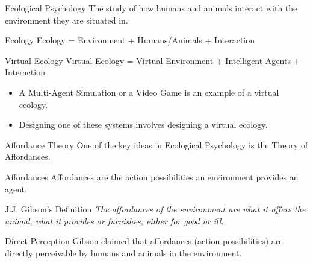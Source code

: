 \documentclass[xcolor=dvipsnames,t]{beamer}
\begin{document}
\begin{frame}{Ecological Psychology} 
    The study of how humans and animals interact with the environment they are
    situated in. 

    \begin{block}{Ecology} 
        Ecology = Environment + Humans/Animals + Interaction 
    \end{block} 
\pause
    \begin{block}{Virtual Ecology} 
        Virtual Ecology = Virtual Environment + Intelligent Agents + Interaction 
    \end{block} 
\pause
    \begin{itemize} 
        \item A Multi-Agent Simulation or a Video Game is an example of a virtual ecology. 
        \item Designing one of these systems involves designing a virtual ecology. 
    \end{itemize} 
\end{frame} 

\begin{frame}{Affordance Theory} 
    One of the key ideas in Ecological Psychology is the Theory of Affordances.

    \begin{block}{Affordances} 
        Affordances are the action possibilities an environment provides an agent.
    \end{block} 
\pause
    \begin{block}{J.J. Gibson's Definition} 
        \emph{The affordances of the environment are what it offers the animal, what it
        provides or furnishes, either for good or ill.} 
    \end{block} 
\pause 
    \begin{block}{Direct Perception} 
        Gibson claimed that affordances (action possibilities) are directly perceivable
        by humans and animals in the environment. 
    \end{block} 
\end{frame} 
\end{document}
